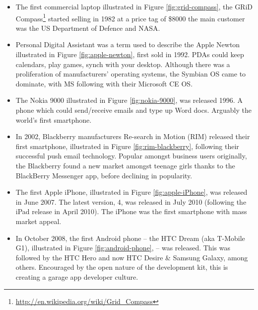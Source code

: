 \begin{itemize}

\item The first commercial laptop illustrated in Figure \ref{fig:grid-compass}, the GRiD Compass\footnote{\url{http://en.wikipedia.org/wiki/Grid_Compass}} started selling in 1982 at a price tag of \$8000 the main customer was the US Department of Defence and NASA.

\item Personal Digital Assistant was a term used to describe the Apple Newton  illustrated in Figure \ref{fig:apple-newton}, first sold in 1992. PDAs could keep calendars, play games, synch with your desktop. Although there was a proliferation of manufacturers' operating systems, the Symbian OS came to dominate, with MS following with their Microsoft CE OS.

\item The Nokia 9000  illustrated in Figure \ref{fig:nokia-9000}, was released 1996. A phone which could send/receive emails and type up Word docs. Arguably the world's first smartphone.

\item In 2002, Blackberry manufacturers Re-search in Motion (RIM) released their first smartphone,  illustrated in Figure \ref{fig:rim-blackberry}, following their successful push email technology. Popular amongst business users originally, the Blackberry found a new market amongst teenage girls thanks to the BlackBerry Messenger app, before declining in popularity.

\item The first Apple iPhone, illustrated in Figure \ref{fig:apple-iPhone}, was released in June 2007. The latest version, 4, was released in July 2010 (following the iPad release in April 2010). The iPhone was the first smartphone with mass market appeal.

\item In October 2008, the first Android phone – the HTC Dream (aka T-Mobile G1), illustrated in Figure \ref{fig:android-phone}, – was released. This was followed by the HTC Hero and now HTC Desire \& Samsung Galaxy, among others. Encouraged by the open nature of the development kit, this is creating a garage app developer culture.

\end{itemize}

